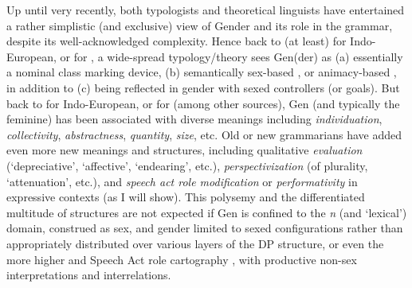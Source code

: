 Up until very recently, both typologists and theoretical linguists have
entertained a rather simplistic (and exclusive) view of Gender and its role in
the grammar, despite its well-acknowledged complexity. Hence back to (at least)
\citet{Grimm1822} for Indo-European, or \citet{Caspari1859} for , a
wide-spread typology/theory sees Gen(der) as (a) essentially a nominal class
marking device, (b) semantically sex-based
\citep[e.g.][]{Corbett1991,KibortEtAl2008}, or animacy-based \citep{Dahl2000},
in addition to (c) being reflected in gender  \citep{KibortEtAl2008}
with sexed controllers (or goals). But back to \citet{Brugmann1897} for Indo-European, or \citet{Brockelmann1910} for  (among other sources), Gen
(and typically the feminine) has been associated with diverse meanings
including \textit{individuation}, \textit{collectivity}, \textit{abstractness},
\textit{quantity}, \textit{size}, etc. Old or new grammarians have added even
more new meanings and structures, including qualitative \textit{evaluation}
(`depreciative', `affective', `endearing', etc.), \textit{perspectivization}
(of plurality, `attenuation', etc.), and \textit{speech act role modification}
or \textit{performativity} in expressive contexts (as I will show). This
polysemy and the differentiated multitude of structures are not expected if Gen
is confined to the \textit{n} (and `lexical') domain, construed as sex, and
gender  limited to sexed configurations rather than appropriately
distributed over various layers of the DP structure, or even the more higher 
and Speech Act role cartography \citep[as in][]{SpeasEtAl2003,Hill2014}, with
productive non-sex interpretations and interrelations.


